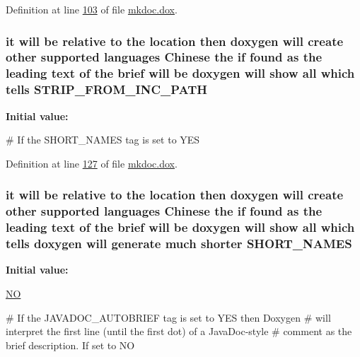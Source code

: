 Definition at line \hyperlink{mkdoc_8dox_source_l00103}{103} of file \hyperlink{mkdoc_8dox_source}{mkdoc.\-dox}.

\hypertarget{mkdoc_8dox_a6d297e0f2850b59accd7903a23e2ecff}{
\subsubsection[{S\-T\-R\-I\-P\-\_\-\-F\-R\-O\-M\-\_\-\-I\-N\-C\-\_\-\-P\-A\-T\-H}]{\setlength{\rightskip}{0pt plus 5cm}it will be relative to the location then doxygen will create other supported languages {\bf Chinese} the if found as the leading text of the brief will be doxygen will show all which tells S\-T\-R\-I\-P\-\_\-\-F\-R\-O\-M\-\_\-\-I\-N\-C\-\_\-\-P\-A\-T\-H}}\label{mkdoc_8dox_a6d297e0f2850b59accd7903a23e2ecff}
{\bfseries Initial value\-:}
\begin{DoxyCode}
 

\textcolor{preprocessor}{# If the SHORT\_NAMES tag is set to YES}
\end{DoxyCode}


Definition at line \hyperlink{mkdoc_8dox_source_l00127}{127} of file \hyperlink{mkdoc_8dox_source}{mkdoc.\-dox}.

\hypertarget{mkdoc_8dox_a8b98f3c06d38ae31f6e77655f4e4bf0a}{
\subsubsection[{S\-H\-O\-R\-T\-\_\-\-N\-A\-M\-E\-S}]{\setlength{\rightskip}{0pt plus 5cm}it will be relative to the location then doxygen will create other supported languages {\bf Chinese} the if found as the leading text of the brief will be doxygen will show all which tells doxygen will generate much shorter S\-H\-O\-R\-T\-\_\-\-N\-A\-M\-E\-S}}\label{mkdoc_8dox_a8b98f3c06d38ae31f6e77655f4e4bf0a}
{\bfseries Initial value\-:}
\begin{DoxyCode}
 \hyperlink{mkdoc_8dox_a0f6a46245280dc38baf9600906aa1393}{NO}

\textcolor{preprocessor}{# If the JAVADOC\_AUTOBRIEF tag is set to YES then Doxygen }
\textcolor{preprocessor}{}\textcolor{preprocessor}{# will interpret the first line (until the first dot) of a JavaDoc-style }
\textcolor{preprocessor}{# comment as the brief description. If set to NO}
\end{DoxyCode}


